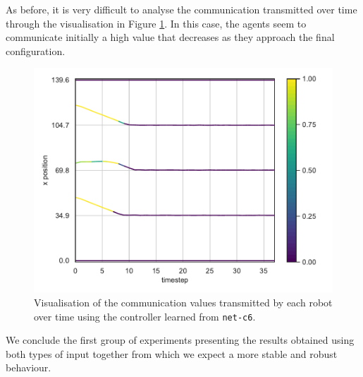 As before, it is very difficult to analyse the communication transmitted over time 
through the visualisation in Figure \ref{fig:net-c6comm}. In this case, the agents 
seem to communicate initially a high value that decreases as they approach the 
final configuration.
\begin{figure}[!htb]
	\centering
	\includegraphics[width=.65\textwidth]{contents/images/net-c6/4/plot-simulation-communication-4}
	\vspace{-0.5cm}
	\caption[Evaluation of the communication learned by 
	\texttt{net-c6}.]{Visualisation of the communication values transmitted by each 
		robot over time using the controller learned from \texttt{net-c6}.}	
	\label{fig:net-c6comm}
\end{figure}

We conclude the first group of experiments presenting the results obtained using 
both types of input together from which we expect a more stable and robust 
behaviour.

